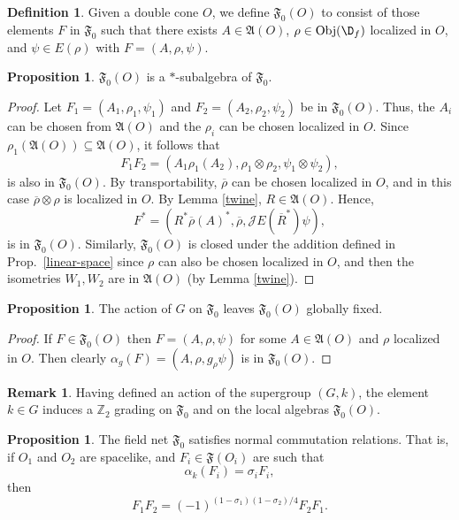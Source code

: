 \documentclass[12pt]{article}
\newcommand{\alg}[1]{\mathfrak{#1}}
\theoremstyle{definition}
\newtheorem{prop}[thm]{Proposition}
\theoremstyle{definition}
\newtheorem{defn}[thm]{Definition}
\newtheorem{note}[thm]{Remark}
\theoremstyle{remark}
\newcommand{\Obj}{\mathrm{Obj}}
\def\7#1{{\mathbb #1}}
\def\ol#1{{\overline #1}}
\def\a{\alpha} \def\b{\beta} \def\g{\gamma} \def\d{\delta}
\begin{document}
\begin{defn} Given a double cone $O$, we define $\alg{F}_0 (O)$ to consist of those
  elements $F$ in $\alg{F}_0 $ such that there exists $A\in \alg{A}(O)$, $\rho \in
  \Obj (\D _f )$ localized in $O$, and $\psi \in E(\rho )$ with $F=(A,\rho ,\psi )$.
\end{defn}

\begin{prop} $\alg{F}_0 (O)$ is a $*$-subalgebra of $\alg{F}_0 $.  \end{prop}

\begin{proof} Let $F_1=(A_1,\rho _1,\psi _1)$ and $F_2=(A_2,\rho _2,\psi _2)$ be in
  $\alg{F}_0 (O)$.  Thus, the $A_i$ can be chosen from $\alg{A}(O)$ and the $\rho _i$
  can be chosen localized in $O$.  Since $\rho _1(\alg{A}(O))\subseteq \alg{A}(O)$,
  it follows that 
$$ F_1F_2 = (A_1\rho _1(A_2),\rho _1\otimes \rho _2,\psi _1\otimes \psi _2) ,$$
is also in $\alg{F}_0 (O)$.  By transportability, $\ol\rho$ can be chosen localized in
$O$, and in this case $\ol\rho \otimes \rho$ is localized in $O$.  By Lemma
\ref{twine}, $R\in \alg{A}(O)$.  Hence,
$$ F^*=(R^*\ol\rho (A)^*,\ol\rho ,\mathcal{J}E(\ol R^*)\psi ) ,$$
is in $\alg{F}_0 (O)$.  Similarly, $\alg{F}_0 (O)$ is closed under the addition defined in
Prop.\ \ref{linear-space} since $\rho$ can also be chosen localized in $O$, and then
the isometries $W_1,W_2$ are in $\alg{A}(O)$ (by Lemma \ref{twine}).
\end{proof}


\begin{prop} The action of $G$ on $\alg{F}_0$ leaves $\alg{F}_0(O)$ globally fixed.
\end{prop}

\begin{proof} If $F\in \alg{F}_0(O)$ then $F=(A,\rho ,\psi )$ for some $A\in
  \alg{A}(O)$ and $\rho$ localized in $O$.  Then clearly $\a _g(F)=(A,\rho ,g_\rho
  \psi )$ is in $\alg{F} _0(O)$.  \end{proof}

\begin{note} Having defined an action of the supergroup $(G,k)$, the element $k\in G$
  induces a $\7Z _2$ grading on $\alg{F}_0$ and on the local algebras
  $\alg{F}_0(O)$.  

\end{note}



\begin{prop} The field net $\alg{F}_0$ satisfies normal commutation relations.  That
  is, if $O_1$ and $O_2$ are spacelike, and $F_i\in \alg{F}(O_i)$ are such that
  $$ \alpha _k(F_{i})=\sigma _iF_i ,$$ then
  $$ F_1F_2= (-1)^{(1-\sigma _1)(1-\sigma _2)/4}F_2F_1 .$$ \label{normality}
\end{prop}
\end{document}
